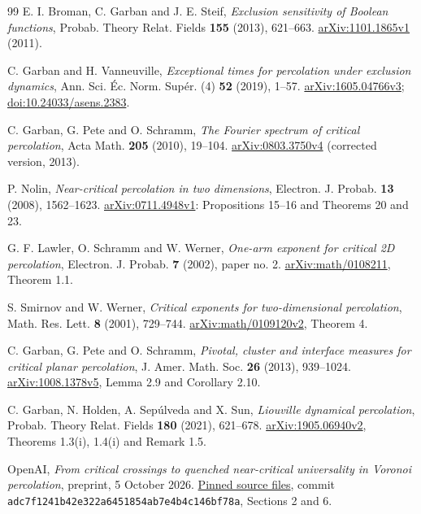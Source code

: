 \documentclass[11pt]{article}
\begin{document}
\begin{thebibliography}{99}
\small
{}
E. I. Broman, C. Garban and J. E. Steif,
\emph{Exclusion sensitivity of Boolean functions},
Probab. Theory Relat. Fields \textbf{155} (2013), 621--663.
\href{https://arxiv.org/abs/1101.1865v1}{arXiv:1101.1865v1} (2011).

C. Garban and H. Vanneuville,
\emph{Exceptional times for percolation under exclusion dynamics},
Ann. Sci. \'Ec. Norm. Sup\'er. (4) \textbf{52} (2019), 1--57.
\href{https://arxiv.org/abs/1605.04766v3}{arXiv:1605.04766v3};
\href{https://doi.org/10.24033/asens.2383}{doi:10.24033/asens.2383}.

C. Garban, G. Pete and O. Schramm,
\emph{The Fourier spectrum of critical percolation},
Acta Math. \textbf{205} (2010), 19--104.
\href{https://arxiv.org/abs/0803.3750v4}{arXiv:0803.3750v4}
(corrected version, 2013).

P. Nolin,
\emph{Near-critical percolation in two dimensions},
Electron. J. Probab. \textbf{13} (2008), 1562--1623.
\href{https://arxiv.org/abs/0711.4948v1}{arXiv:0711.4948v1}:
Propositions 15--16 and Theorems 20 and 23.

G. F. Lawler, O. Schramm and W. Werner,
\emph{One-arm exponent for critical 2D percolation},
Electron. J. Probab. \textbf{7} (2002), paper no. 2.
\href{https://arxiv.org/abs/math/0108211}{arXiv:math/0108211}, Theorem 1.1.

S. Smirnov and W. Werner,
\emph{Critical exponents for two-dimensional percolation},
Math. Res. Lett. \textbf{8} (2001), 729--744.
\href{https://arxiv.org/abs/math/0109120v2}{arXiv:math/0109120v2}, Theorem 4.

C. Garban, G. Pete and O. Schramm,
\emph{Pivotal, cluster and interface measures for critical planar percolation},
J. Amer. Math. Soc. \textbf{26} (2013), 939--1024.
\href{https://arxiv.org/abs/1008.1378v5}{arXiv:1008.1378v5},
Lemma 2.9 and Corollary 2.10.

C. Garban, N. Holden, A. Sep\'ulveda and X. Sun,
\emph{Liouville dynamical percolation},
Probab. Theory Relat. Fields \textbf{180} (2021), 621--678.
\href{https://arxiv.org/abs/1905.06940v2}{arXiv:1905.06940v2},
Theorems 1.3(i), 1.4(i) and Remark 1.5.

OpenAI,
\emph{From critical crossings to quenched near-critical universality
in Voronoi percolation}, preprint, 5 October 2026.
\href{https://github.com/openai/math/tree/adc7f1241b42e322a6451854ab7e4b4c146bf78a/preprints/From-critical-crossings-to-quenched-near-critical-universality-in-Voronoi-percolation-October-5-2026/build/sections}{Pinned source files},
commit \texttt{adc7f1241b42e322a6451854ab7e4b4c146bf78a},
Sections 2 and 6.


\end{thebibliography}
\end{document}
